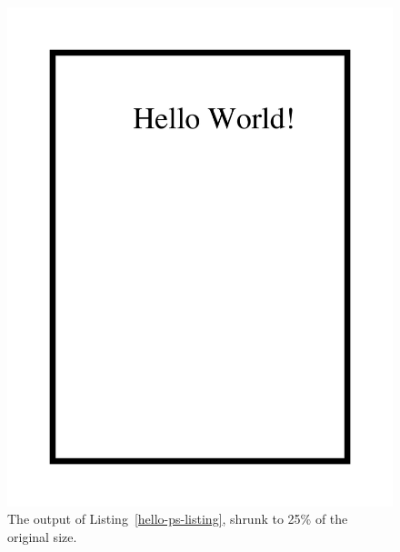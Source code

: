 \begin{figure}
\includegraphics[scale=.25]{ch-pdf/hello-ps.pdf}
\caption{The output of Listing~\ref{hello-ps-listing}, shrunk to 25\% of
  the original size.}\label{hello-ps-figure}
\end{figure}

